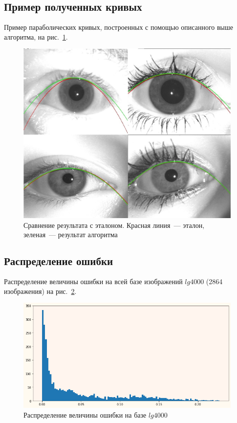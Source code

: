 \documentclass[12pt,a4paper]{article} %
\begin{document}
\subsection{Пример полученных кривых}
Пример параболических кривых, построенных с помощью описанного выше алгоритма, на рис.~\ref{fig:compare}.
\begin{figure}[h]
	
	\centering
	
	\includegraphics[width=0.6\linewidth]{compare.jpg}
	
	\caption{Сравнение результата с эталоном. Красная линия~--- эталон, зеленая~--- результат алгоритма}
	
	\label{fig:compare}
	
\end{figure}

\subsection{Распределение ошибки}
Распределение величины ошибки на всей базе изображений $lg4000$ (2864 изображения) на рис.~\ref{fig:gist}. 

\begin{figure}[h]
	\centering
	
	\includegraphics[width=0.67\linewidth]{gist.jpg}
	\caption{Распределение величины ошибки на базе $lg4000$}
	
	\label{fig:gist}
\end{figure}
\end{document}
